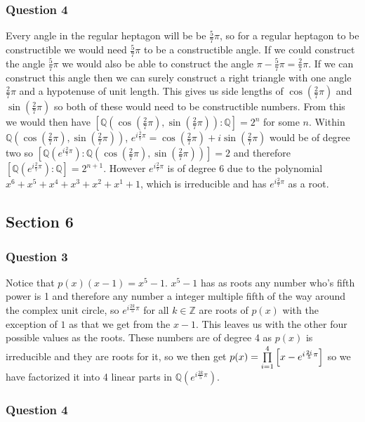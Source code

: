 \documentclass{article}
\begin{document}
\subsubsection{Question 4}
Every angle in the regular heptagon will be be $\frac 57\pi$, so for a regular heptagon to be constructible we would need $\frac 57\pi$ to be a constructible angle. If we could construct the angle $\frac 57\pi$ we would also be able to construct the angle $\pi-\frac57\pi=\frac27\pi$. If we can construct this angle then we can surely construct a right triangle with one angle $\frac27\pi$ and a hypotenuse of unit length. This gives us side lengths of $\cos\left(\frac27\pi\right)$ and $\sin\left(\frac27\pi\right)$ so both of these would need to be constructible numbers. From this we would then have $\left[\mathbb Q\left(\cos\left(\frac27\pi\right), \sin\left(\frac27\pi\right)\right):\mathbb Q\right] = 2^n$ for some $n$. Within $\mathbb Q\left(\cos\left(\frac27\pi\right), \sin\left(\frac27\pi\right)\right)$, $e^{i\frac27\pi} = \cos\left(\frac27\pi\right)+i\sin\left(\frac27\pi\right)$ would be of degree two so $\left[\mathbb Q\left(e^{i\frac27\pi}\right):\mathbb Q\left(\cos\left(\frac27\pi\right), \sin\left(\frac27\pi\right)\right)\right] = 2$ and therefore $\left[\mathbb Q\left(e^{i\frac27\pi}\right):\mathbb Q \right]=2^{n+1}$. However $e^{i\frac27\pi}$ is of degree 6 due to the polynomial $x^6+x^5+x^4+x^3+x^2+x^1+1$, which is irreducible and has $e^{i\frac27\pi}$ as a root.

\subsection{Section 6}
\subsubsection{Question 3}
\def\LB{\left[}\def\RB{\right]}
Notice that $p(x)(x-1) = x^5-1$. $x^5-1$ has as roots any number who's fifth power is 1 and therefore any number a integer multiple fifth of the way around the complex unit circle, so $e^{i\frac{2k}5\pi}$ for all $k\in\mathbb Z$ are roots of $p(x)$ with the exception of $1$ as that we get from the $x-1$. This leaves us with the other four possible values as the roots. These numbers are of degree 4 as $p(x)$ is irreducible and they are roots for it, so we then get $p(x) = \prodfrom{i=1}{4}{x-e^{i\frac{2i}5\pi}}$ so we have factorized it into 4 linear parts in $\mathbb Q\left(e^{i\frac{2k}5\pi}\right)$.

\subsubsection{Question 4}
\end{document}

